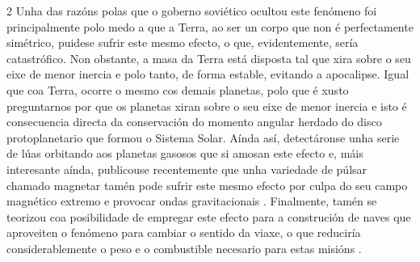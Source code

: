 \begin{multicols}{2}
Unha das razóns polas que o goberno soviético ocultou este fenómeno foi
principalmente polo medo a que a Terra, ao ser un corpo que non é perfectamente
simétrico, puidese sufrir este mesmo efecto, o que, evidentemente, sería
catastrófico. Non obstante, a masa da Terra está disposta tal que xira sobre o
seu eixe de menor inercia e polo tanto, de forma estable, evitando a
apocalipse. Igual que coa Terra, ocorre o mesmo cos demais planetas, polo que é
xusto preguntarnos por que os planetas xiran sobre o seu eixe de menor inercia
e isto é consecuencia directa da conservación do momento angular herdado do
disco protoplanetario que formou o Sistema Solar. Aínda así, detectáronse unha
serie de lúas orbitando aos planetas gasosos que si amosan este efecto e, máis
interesante aínda, publicouse recentemente que unha variedade de púlsar chamado
magnetar tamén pode sufrir este mesmo efecto por culpa do seu campo magnético
extremo e provocar ondas gravitacionais \cite{Kantor2023}. Finalmente, tamén se
teorizou coa posibilidade de empregar este efecto para a construción de naves
que aproveiten o fenómeno para cambiar o sentido da viaxe, o que reduciría
considerablemente o peso e o combustible necesario para estas misións
\cite{Ono2022}.

\printbibliography

\end{multicols}
